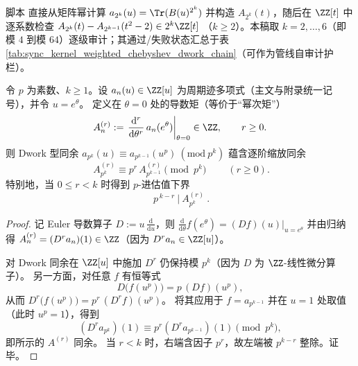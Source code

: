 \begin{remark}\label{rem:chebyshev-dwork-audit}
脚本  直接从矩阵幂计算
\(
a_{2^k}(u)=\Tr(B(u)^{2^k})
\)
并构造 \(A_{2^k}(t)\)，随后在 \(\ZZ[t]\) 中逐系数检查
\(
A_{2^k}(t)-A_{2^{k-1}}(t^2-2)\in 2^k\ZZ[t]
\)
（\(k\ge 2\)）。本稿取 \(k=2,\dots,6\)（即模 \(4\) 到模 \(64\)）逐级审计；其通过/失败状态汇总于表 \ref{tab:sync_kernel_weighted_chebyshev_dwork_chain}（可作为管线自审计护栏）。
\end{remark}


\begin{proposition}\label{prop:witt-theta-derivative-filter}
令 \(p\) 为素数、\(k\ge 1\)。设 \(a_n(u)\in\ZZ[u]\) 为周期迹多项式（主文与附录统一记号），并令 \(u=e^\theta\)。
定义在 \(\theta=0\) 处的导数矩（等价于“幂次矩”）
$$
A_{n}^{(r)}:=\left.\frac{\mathrm{d}^r}{\mathrm{d}\theta^r}\,a_n(e^\theta)\right|_{\theta=0}\in\ZZ,\qquad r\ge 0.
$$
则 Dwork 型同余 \(a_{p^k}(u)\equiv a_{p^{k-1}}(u^p)\ (\mathrm{mod}\ p^k)\) 蕴含逐阶缩放同余
$$
\boxed{\ A_{p^k}^{(r)}\equiv p^r\,A_{p^{k-1}}^{(r)}\pmod{p^k}\ }\qquad(r\ge 0).
$$
特别地，当 \(0\le r<k\) 时得到 \(p\)-进估值下界
$$
\boxed{\ p^{\,k-r}\ \big|\ A_{p^k}^{(r)}\ }.
$$
\end{proposition}
\begin{proof}
记 Euler 导数算子 \(D:=u\,\frac{\mathrm{d}}{\mathrm{d}u}\)，则
\(
\frac{\mathrm{d}}{\mathrm{d}\theta}f(e^\theta)=(Df)(u)\big|_{u=e^\theta}
\)
并由归纳得
\(
A_n^{(r)}=(D^r a_n)(1)\in\ZZ
\)（因为 \(D^r a_n\in\ZZ[u]\)）。
\par
对 Dwork 同余在 \(\ZZ[u]\) 中施加 \(D^r\) 仍保持模 \(p^k\)（因为 \(D\) 为 \(\ZZ\)-线性微分算子）。
另一方面，对任意 \(f\) 有恒等式
$$
D\bigl(f(u^p)\bigr)=p\,(Df)(u^p),
$$
从而 \(D^r\bigl(f(u^p)\bigr)=p^r\,(D^r f)(u^p)\)。
将其应用于 \(f=a_{p^{k-1}}\) 并在 \(u=1\) 处取值（此时 \(u^p=1\)），得到
$$
(D^r a_{p^k})(1)\equiv p^r (D^r a_{p^{k-1}})(1)\pmod{p^k},
$$
即所示的 \(A^{(r)}\) 同余。
当 \(r<k\) 时，右端含因子 \(p^r\)，故左端被 \(p^{k-r}\) 整除。证毕。
\end{proof}

